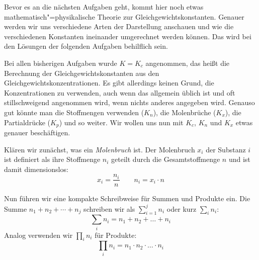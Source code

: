 \documentclass[DIV11]{scrartcl}
\begin{document}
\begin{intermission}
  Bevor es an die nächsten Aufgaben geht, kommt hier noch etwas
  mathematisch"=physikalische Theorie zur Gleichgewichtskonstanten.
  Genauer  werden wir uns verschiedene Arten der Darstellung anschauen und wie
  die  verschiedenen Konstanten ineinander umgerechnet werden können.  Das
  wird bei den Lösungen der folgenden Aufgaben behilflich sein.

  Bei allen bisherigen Aufgaben wurde $K=K_c$ angenommen, das heißt die
  Berechnung der Gleichgewichtskonstanten aus den
  Gleichgewichtskonzentrationen.  Es gibt allerdings keinen Grund, die
  Konzentrationen zu verwenden, auch wenn das allgemein üblich ist und oft
  stillschweigend angenommen wird, wenn nichts anderes angegeben wird.
  Genauso gut könnte man die Stoffmengen verwenden ($K_n$), die Molenbrüche
  ($K_x$), die Partialdrücke ($K_p$) und so weiter.  Wir wollen uns nun mit
  $K_c$, $K_n$ und $K_x$ etwas genauer beschäftigen.

  Klären wir zunächst, was ein \emph{Molenbruch} ist.  Der Molenbruch $x_i$
  der Substanz $i$ ist definiert als ihre Stoffmenge $n_i$ geteilt durch die
  Gesamtstoffmenge $n$ und ist damit dimensionslos:
  \[
    x_i = \frac{n_i}{n} \qquad n_i = x_i \cdot n
  \]

  Nun führen wir eine kompakte Schreibweise für Summen und Produkte ein.
  Die Summe $n_1 + n_2 + \cdots + n_j$ schreiben wir als $\sum_{i=1}^j n_i$
  oder kurz $\sum_i n_i$:
  \[ \sum_i n_i = n_1 + n_2 + \ldots + n_i \]
  Analog verwenden wir $\prod_i n_i$ für Produkte:
  \[ \prod_i n_i = n_1 \cdot n_2 \cdot \ldots \cdot n_i \]


\end{intermission}
\end{document}
